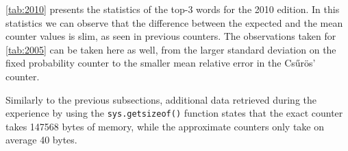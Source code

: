 \autoref{tab:2010} presents the statistics of the top-3 words for the 2010 edition.
In this statistics we can observe that the difference between the expected and the mean counter values is slim, as seen in previous counters.
The observations taken for \autoref{tab:2005} can be taken here as well, from the larger standard deviation on the fixed probability counter to the smaller mean relative error in the Csűrös' counter.
\begin{table}[!ht]
\centering
\caption{Statistics of the top-3 words for the 2010 edition, according to the fixed probability counter and the Csűrös' Counter.}
\label{tab:2010}
\end{table}

Similarly to the previous subsections, additional data retrieved during the experience by using the \verb|sys.getsizeof()| function states that the exact counter takes 147568 bytes of memory, while the approximate counters only take on average 40 bytes.

\newpage